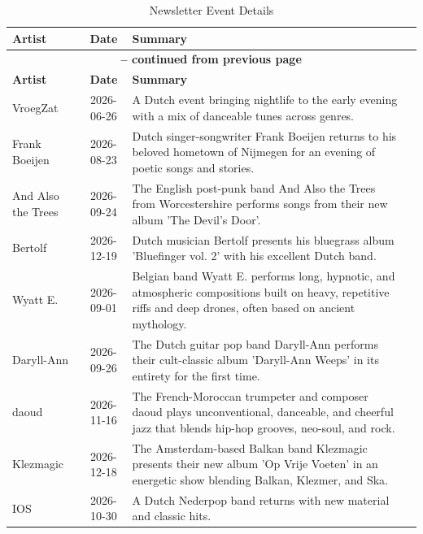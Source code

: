\begin{center}
\begin{longtable}{p{3cm}cp{7cm}p{3cm}} %
\caption{Newsletter Event Details} \label{tab:newsletters} \\
\toprule
\textbf{Artist} & \textbf{Date} & \textbf{Summary} \\
\midrule
\endfirsthead

\multicolumn{3}{c}{{\bfseries \tablename\ \thetable{} -- continued from previous page}} \\
\toprule
\textbf{Artist} & \textbf{Date} & \textbf{Summary} \\
\midrule
\endhead

\bottomrule
\endfoot

\bottomrule
\endlastfoot

VroegZat & 2026-06-26 & A Dutch event bringing nightlife to the early evening with a mix of danceable tunes across genres. \\
\midrule
Frank Boeijen & 2026-08-23 & Dutch singer-songwriter Frank Boeijen returns to his beloved hometown of Nijmegen for an evening of poetic songs and stories. \\
\midrule
And Also the Trees & 2026-09-24 & The English post-punk band And Also the Trees from Worcestershire performs songs from their new album 'The Devil's Door'. \\
\midrule
Bertolf & 2026-12-19 & Dutch musician Bertolf presents his bluegrass album 'Bluefinger vol. 2' with his excellent Dutch band. \\
\midrule
Wyatt E. & 2026-09-01 & Belgian band Wyatt E. performs long, hypnotic, and atmospheric compositions built on heavy, repetitive riffs and deep drones, often based on ancient mythology. \\
\midrule
Daryll-Ann & 2026-09-26 & The Dutch guitar pop band Daryll-Ann performs their cult-classic album 'Daryll-Ann Weeps' in its entirety for the first time. \\
\midrule
daoud & 2026-11-16 & The French-Moroccan trumpeter and composer daoud plays unconventional, danceable, and cheerful jazz that blends hip-hop grooves, neo-soul, and rock. \\
\midrule
Klezmagic & 2026-12-18 & The Amsterdam-based Balkan band Klezmagic presents their new album 'Op Vrije Voeten' in an energetic show blending Balkan, Klezmer, and Ska. \\
\midrule
IOS & 2026-10-30 & A Dutch Nederpop band returns with new material and classic hits. \\

\end{longtable}
\end{center}
